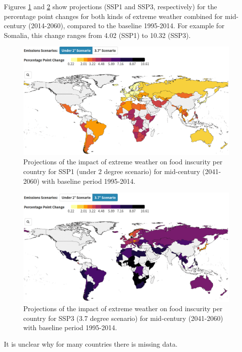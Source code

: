 \documentclass[
]{krantz}
\begin{document}
Figures \ref{fig:food2ssp1strobl} and \ref{fig:food2ssp3strobl} show projections (SSP1 and SSP3, respectively) for the percentage point changes for both kinds of extreme weather combined for mid-century (2014-2060), compared to the baseline 1995-2014. For example for Somalia, this change ranges from 4.02 (SSP1) to 10.32 (SSP3).

\begin{figure}
\includegraphics[width=1\linewidth]{work/08-lancet/figures/indicator_3_2} \caption{Projections of the impact of extreme weather on food inscurity per country for SSP1 (under 2 degree scenario) for mid-century (2041-2060) with baseline period 1995-2014.}\label{fig:food2ssp1strobl}
\end{figure}
\begin{figure}
\includegraphics[width=1\linewidth]{work/08-lancet/figures/indicator_3_3} \caption{Projections of the impact of extreme weather on food inscurity per country for SSP3 (3.7 degree scenario) for mid-century (2041-2060) with baseline period 1995-2014.}\label{fig:food2ssp3strobl}
\end{figure}

It is unclear why for many countries there is missing data.
\end{document}
